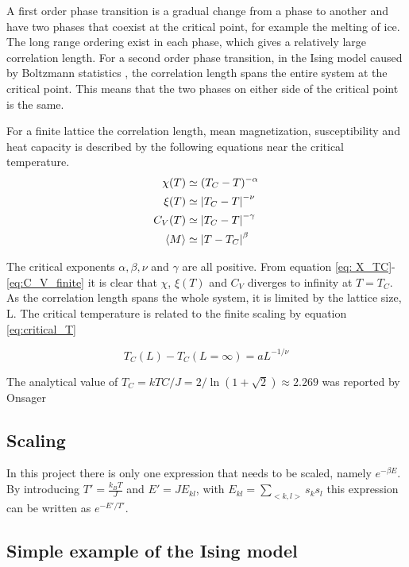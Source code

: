 A first order phase transition is a gradual change from a phase to another and have two phases that coexist at the critical point, for example the melting of ice. The long range ordering exist in each phase, which gives a relatively large correlation length. For a second order phase transition, in the Ising model caused by  Boltzmann statistics , the correlation length spans the entire system at the critical point. This means that the two phases on either side of the critical point is the same. 

For a finite lattice the correlation length, mean magnetization,  susceptibility and heat capacity  is described by the following equations  near the critical temperature. 
\begin{align}
	\chi(T) &\simeq (T_C-T)^{-\alpha}\label{eq: X_TC}\\
		\xi (T) &\simeq \abs{T_C-T}^{-\nu} \\
	C_V(T) &\simeq \abs{T_C-T}^{-\gamma} \label{eq:C_V_finite}\\
		\langle M\rangle &\simeq \abs{T-T_C}^{\beta}\\
 \end{align}

The critical exponents $ \alpha, \beta, \nu $ and $ \gamma $ are all positive. From equation \ref{eq: X_TC}-\ref{eq:C_V_finite} it is clear that $\chi$,  $\xi (T)$ and $ C_V $  diverges to infinity at $ T = T_C $. As the correlation length spans the whole system, it is limited by the lattice size, L. The critical temperature is related to the finite scaling by equation \ref{eq:critical_T}

\begin{equation}\label{eq:critical_T}
	T_C(L) - T_C(L=\infty) = a L^{-1/\nu}
\end{equation}

The analytical value of 
 $T_C =  kTC/J = 2/ \ln(1+\sqrt{
	2}) \approx 2.269$  was reported by Onsager \cite{Onsager}

\subsection{Scaling}

In this project there is only one expression that needs to be scaled, namely $ e^{-\beta E} $. By introducing $ T' = \frac{k_B T	}{J} $ and $ E' = JE_{kl} $, with $ E_{kl} = \sum\limits_{<k,l>} s_ks_l $ this expression can be written as $ e^{-E'/T'} $.

\subsection{Simple example of the Ising model \label{sec_L2}}

